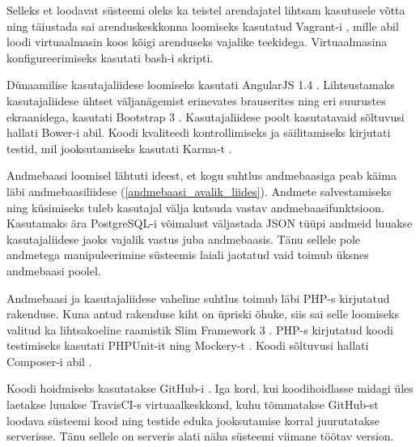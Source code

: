 \documentclass[a4paper,12pt]{article} %
\begin{document}
Selleks et loodavat süsteemi oleks ka teistel arendajatel lihtsam kasutusele võtta ning täiustada sai arenduskeskkonna loomiseks kasutatud Vagrant-i \cite{Vagrant}, mille abil loodi virtuaalmasin koos kõigi arenduseks vajalike teekidega. Virtuaalmasina konfigureerimiseks kasutati bash-i skripti.\par

Dünaamilise kasutajaliidese loomiseks kasutati AngularJS 1.4 \cite{AngularJS}. Lihtsustamaks kasutajaliidese ühtset väljanägemist erinevates brauserites ning eri suurustes ekraanidega, kasutati Bootstrap 3 \cite{Bootstrap}. Kasutajaliidese poolt kasutatavaid sõltuvusi hallati Bower-i \cite{Bower} abil. Koodi kvaliteedi kontrollimiseks ja säilitamiseks kirjutati testid, mil jooksutamiseks kasutati Karma-t \cite{Karma}.\par

Andmebaasi loomisel lähtuti ideest, et kogu suhtlus andmebaasiga peab käima läbi andmebaasiliidese (\ref{andmebaasi_avalik_liides}). Andmete salvestamiseks ning küsimiseks tuleb kasutajal välja kutsuda vastav andmebaasifunktsioon. Kasutamaks ära PostgreSQL-i \cite{PostgreSQL} võimalust väljastada JSON tüüpi andmeid luuakse kasutajaliidese jaoks vajalik vastus juba andmebaasis. Tänu sellele pole andmetega manipuleerimine süsteemis laiali jaotatud vaid toimub üksnes andmebaasi poolel.\par

Andmebaasi ja kasutajaliidese vaheline suhtlus toimub läbi PHP-s \cite{PHP} kirjutatud rakenduse. Kuna antud rakenduse kiht on üpriski õhuke, siis sai selle loomiseks valitud ka lihtsakoeline raamistik Slim Framework 3 \cite{SlimFW}. PHP-s kirjutatud koodi testimiseks kasutati PHPUnit-it \cite{PHPUnit} ning Mockery-t \cite{Mockery}. Koodi sõltuvusi hallati Composer-i abil \cite{Composer}. \par

Koodi hoidmiseks kasutatakse GitHub-i \cite{GitHub}. Iga kord, kui koodihoidlasse midagi üles laetakse luuakse TravisCI-s \cite{TravisCI} virtuaalkeskkond, kuhu tõmmatakse GitHub-st loodava süsteemi kood ning testide eduka jooksutamise korral juurutatakse serverisse. Tänu sellele on serveris alati näha süsteemi viimane töötav version.
\end{document}
